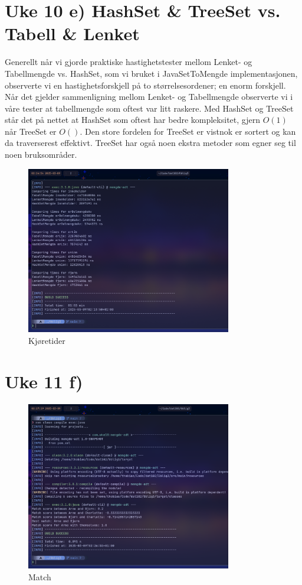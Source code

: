\documentclass[12pt]{article}
\begin{document}
\section*{Uke 10 e) HashSet \& TreeSet vs. Tabell \& Lenket }
Generellt når vi gjorde praktiske hastighetstester mellom Lenket- og Tabellmengde 
vs. HashSet, som vi bruket i JavaSetToMengde implementasjonen, observerte vi 
en hastighetsforskjell på to størrelsesordener; en enorm forskjell. 
Når det gjelder sammenligning mellom Lenket- og Tabellmengde observerte vi i våre tester at 
tabellmengde som oftest var litt raskere. Med HashSet og TreeSet står det på nettet at 
HashSet som oftest har bedre kompleksitet, gjern \(O(1)\) når TreeSet er \(O()\).  
Den store fordelen for TreeSet er vistnok er sortert og kan da traverserest effektivt. 
TreeSet har også noen ekstra metoder som egner seg til noen bruksområder.

\begin{figure}[h]
    \centering
    \includegraphics[width=0.8\textwidth]{./EffektivitetsSammenligning.png} 
    \caption{Kjøretider}
    \label{fig:runtimes}
\end{figure}

\section*{Uke 11 f)} 
\begin{figure}[h]
    \centering
    \includegraphics[width=0.8\textwidth]{./Match.png} 
    \caption{Match}
    \label{fig:match}
\end{figure}
\end{document}
